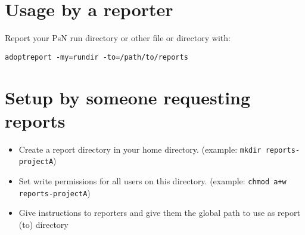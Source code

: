 \documentclass[a4wide,12pt]{article}
\date{#1}
\title{#1\\ }
\date{Revised #2}
\title{#1}
\date{#2}
\renewcommand{\_}{\textscale{.7}{\textunderscore}}
\begin{document}
\maketitle
\newcommand{\guidetoolname}{adoptreport}


\section{Usage by a reporter}

Report your PsN run directory or other file or directory with:

\verb|adoptreport -my=rundir -to=/path/to/reports|

\section{Setup by someone requesting reports}

\begin{itemize}
    \item Create a report directory in your home directory. (example: \verb|mkdir reports-projectA|)
    \item Set write permissions for all users on this directory. (example: \verb|chmod a+w reports-projectA|)
    \item Give instructions to reporters and give them the global path to use as report (to) directory 
\end{itemize}
\end{document}
